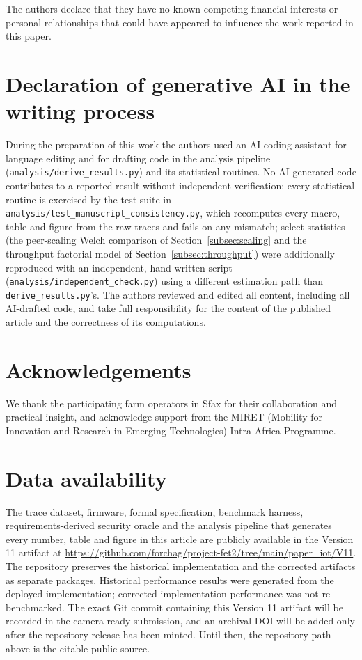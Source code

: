 \documentclass[a4paper,fleqn]{cas-sc}
\begin{document}
The authors declare that they have no known competing financial interests or
personal relationships that could have appeared to influence the work
reported in this paper.

\section*{Declaration of generative AI in the writing process}

During the preparation of this work the authors used an AI coding assistant
for language editing and for drafting code in the analysis pipeline
(\texttt{analysis/derive\_results.py}) and its statistical routines. No
AI-generated code contributes to a reported result without independent
verification: every statistical routine is exercised by the test suite in
\texttt{analysis/test\_manuscript\_consistency.py}, which recomputes every
macro, table and figure from the raw traces and fails on any mismatch;
select statistics (the peer-scaling Welch comparison of
Section~\ref{subsec:scaling} and the throughput factorial model of
Section~\ref{subsec:throughput}) were additionally reproduced with an
independent, hand-written script (\texttt{analysis/independent\_check.py})
using a different estimation path than \texttt{derive\_results.py}'s. The
authors reviewed and edited all content, including all AI-drafted code,
and take full responsibility for the content of the published article and
the correctness of its computations.

\section*{Acknowledgements}

We thank the participating farm operators in Sfax for their collaboration and
practical insight, and acknowledge support from the MIRET (Mobility for
Innovation and Research in Emerging Technologies) Intra-Africa Programme.

\section*{Data availability}

The trace dataset, firmware, formal specification, benchmark harness,
requirements-derived security oracle and the analysis pipeline that
generates every number, table and figure in this article are publicly
available in the Version 11 artifact at
\url{https://github.com/forchag/project-fet2/tree/main/paper_iot/V11}.
The repository preserves the historical implementation and the corrected
artifacts as separate packages. Historical performance results were
generated from the deployed implementation; corrected-implementation
performance was not re-benchmarked. The exact Git commit containing this
Version 11 artifact will be recorded in the camera-ready submission, and
an archival DOI will be added only after the repository release has been
minted. Until then, the repository path above is the citable public source.

\clearpage


\end{document}
